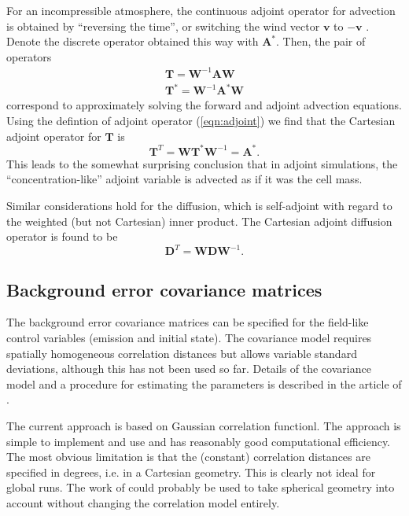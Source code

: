 \documentclass[a4paper]{article}
\begin{document}
For an incompressible atmosphere, the continuous adjoint operator for advection is
obtained by ``reversing the time'', or switching the wind vector $\mathbf{v}$ to
$-\mathbf{v}$ \citep{Marchuk1995,Elbern1999}. Denote the discrete operator obtained this
way with $\mathbf{A}^*$. Then, the pair of operators
\begin{eqnarray}
\mathbf{T} = \mathbf{W}^{-1} \mathbf{AW} \nonumber \\ 
\mathbf{T}^* = \mathbf{W}^{-1} \mathbf{A}^* \mathbf{W} 
\end{eqnarray}
correspond to approximately solving the forward and adjoint advection equations. Using the
defintion of adjoint operator (\ref{eqn:adjoint}) we find that the Cartesian adjoint
operator for $\mathbf{T}$ is 
\begin{equation}
\mathbf{T}^T = \mathbf{WT}^* \mathbf{W}^{-1} = \mathbf{A}^*.
\end{equation}
This leads to the somewhat surprising conclusion that in adjoint simulations, the
``concentration-like'' adjoint variable is advected as if it was the cell mass.

Similar considerations hold for the diffusion, which is self-adjoint with regard to the
weighted (but not Cartesian) inner product. The Cartesian adjoint diffusion operator is
found to be
\begin{equation}
\mathbf{D}^T = \mathbf{W} \mathbf{D} \mathbf{W}^{-1}.
\end{equation}

\subsection{Background error covariance matrices}

The background error covariance matrices can be specified for the field-like control
variables (emission and initial state). The covariance model requires spatially
homogeneous correlation distances but allows variable standard deviations, although this
has not been used so far. Details of the covariance model and a procedure for estimating
the parameters is described in the article of \citet{Vira2015a}.

The current approach is based on Gaussian correlation functionl. The approach is simple to
implement and use and has reasonably good computational efficiency. The most obvious
limitation is that the (constant) correlation distances are specified in degrees, i.e. in
a Cartesian geometry. This is clearly not ideal for global runs. The work of
\cite{Singh2011} could probably be used to take spherical geometry into account without
changing the correlation model entirely.
\end{document}
